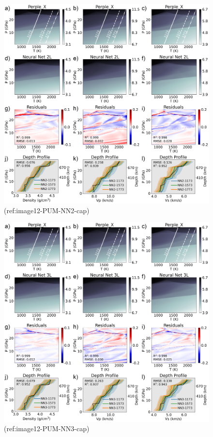 \documentclass[draft]{agujournal2018}
\begin{document}
\begin{figure}[htbp]

{\centering \includegraphics[width=1\linewidth,]{image12-PUM-NN2} 

}

\caption{(ref:image12-PUM-NN2-cap)}\label{fig:image12-PUM-NN2}
\end{figure}



\begin{figure}[htbp]

{\centering \includegraphics[width=1\linewidth,]{image12-PUM-NN3} 

}

\caption{(ref:image12-PUM-NN3-cap)}\label{fig:image12-PUM-NN3}
\end{figure}
\end{document}
